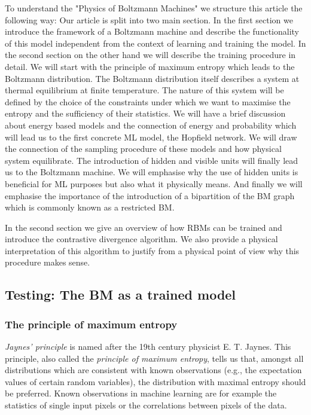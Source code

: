 \documentclass[nofootinbib, superscriptaddress, prl]{revtex4}
\begin{document}
To understand the "Physics of Boltzmann Machines" we structure this article the following way:
Our article is split into two main section. In the first section we introduce the framework of a Boltzmann machine and describe the functionality of this model independent from the context of learning and training the model. 
In the second section on the other hand we will describe the training procedure in detail. 
We will start with the principle of maximum entropy which leads to the Boltzmann distribution. The Boltzmann distribution itself describes a system at thermal equilibrium at finite temperature. The nature of this system will be defined by the choice of the constraints under which we want to maximise the entropy and the sufficiency of their statistics. We will have a brief discussion about energy based models and the connection of energy and probability which will lead us to the first concrete ML model, the Hopfield network. We will draw the connection of the sampling procedure of these models and how physical system equilibrate. The introduction of hidden and visible units will finally lead us to the Boltzmann machine. We will emphasise why the use of hidden units is beneficial for ML purposes but also what it physically means. And finally we will emphasise the importance of the introduction of a bipartition of the BM graph which is commonly known as a restricted BM.

In the second section we give an overview of how RBMs can be trained and introduce the contrastive divergence algorithm. We also provide a physical interpretation of this algorithm to justify from a physical point of view why this procedure makes sense.

\subsection{Testing: The BM as a trained model}

\subsubsection{The principle of maximum entropy}

\emph{Jaynes' principle} is named after the 19th century physicist E. T. Jaynes. This principle, also called the \emph{principle of maximum entropy}, tells us that, amongst all distributions which are consistent with known observations (e.g., the expectation values of certain random variables), the distribution with maximal entropy should be preferred. Known observations in machine learning are for example the statistics of single input pixels or the correlations between pixels of the data.
\end{document}
